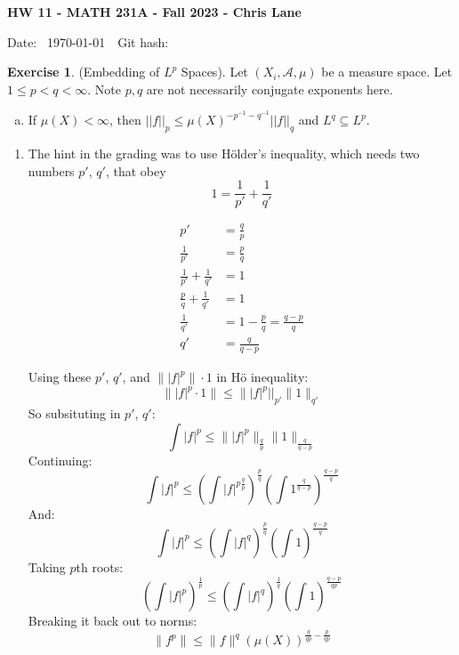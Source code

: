 \documentclass[11pt,oneside]{article}
\numberwithin{equation}{section}
\theoremstyle{definition}
\newtheorem{exercise}{Exercise}
\def\fancyA{\mathscr{A}}
\begin{document}
\textbf{HW 11 - MATH 231A - Fall 2023 - Chris Lane}

Date: \hhmmsstime{} \ \today \ \ Git hash: 
 

\begin{exercise}
  (Embedding of $L^p$ Spaces).  Let $(X_i, \fancyA, \mu)$ be a measure space.
  Let $1 \leq p < q < \infty$.  Note $p, q$ are not necessarily
  conjugate exponents here.
  \begin{enumerate}[(a)]
  \item
    If $\mu(X) < \infty$, then $||f||_p \leq \mu(X)^{-p^{-1}-q^{-1}} || f|| _q$ and $L^q \subseteq L^p$. 
  \end{enumerate}
\end{exercise}

\begin{solution}
  \begin{enumerate}
  \item
    The hint in the grading was to use H\"{o}lder's inequality, which needs two
    numbers $p'$, $q'$, that obey
    \[
      1 = \frac{1}{p'} + \frac{1}{q'}
  \]

  \begin{align*}
    p' & = \frac{q}{p} \\
    \frac{1}{p'} & = \frac{p}{q} \\
    \frac{1}{p'} + \frac{1}{q'} & = 1 \\
    \frac{p}{q}  + \frac{1}{q'} & = 1 \\
    \frac{1}{q'}  & = 1 - \frac{p}{q}  = \frac{q - p}{q} \\
    {q'}  & = \frac{q}{q - p} 
  \end{align*}

  Using these $p'$, $q'$, and $\| |f|^p \| \cdot 1 $ in H\"{o} inequality:
  \[
    \| |f|^p \cdot 1 \| \leq \| |f|^p || _ {p'} \| 1 \| _ {q'} 
  \]
  So subsituting in $p'$, $q'$:
  \[
    \int |f|^p \leq \| |f|^p \| _{\frac{q}{p}} \| 1 \| _{\frac{q}{q-p}} 
  \]
  Continuing: 
  \[
    \int |f|^p \leq \left( \int |f|^{p\frac{q}{p}} \right)^{\frac{p}{q}} \left( \int 1^{\frac{q}{q-p}} \right)^{\frac{q-p}{q}}
  \]
  And:
  \[
    \int |f|^p \leq \left( \int |f|^{q} \right)^{\frac{p}{q}} \left( \int 1 \right)^{\frac{q-p}{q}}
  \]
  Taking $p$th roots:
  \[
    \left( \int |f|^p \right) ^{\frac{1}{p}} \leq \left( \int |f|^{q} \right)^{\frac{1}{q}} \left( \int 1 \right)^{\frac{q-p}{qp}}
  \]
  Breaking it back out to norms:
  \[
    \| f^p \| \leq \| f \|^{q} \left( \mu(X) \right)^{\frac{q}{qp} - \frac{p}{qp}} 
  \]  
\end{enumerate}
\end{solution}
\end{document}

